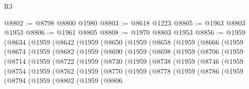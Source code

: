 \begin{lexlean}{R3}
\begin{coremodule}
@8802 := @8798 @8800 @1980
@8803 := @8618 @1223
@8805 := @1963 @8803 @1953
@8806 := @1961 @8805
@8808 := @1970 @8803 @1953
@8856 := @1959
    (@8634
      (@1959
        (@8642
          (@1959
            (@8650
              (@1959
                (@8658
                  (@1959
                    (@8666
                      (@1959
                        (@8674
                          (@1959
                            (@8682
                              (@1959
                                (@8690
                                  (@1959
                                    (@8698
                                      (@1959
                                        (@8706
                                          (@1959
                                            (@8714
                                              (@1959
                                                (@8722
                                                  (@1959
                                                    (@8730
                                                      (@1959
                                                        (@8738
                                                          (@1959
                                                            (@8746
                                                              (@1959
                                                                (@8754
                                                                  (@1959
                                                                    (@8762
                                                                      (@1959
                                                                        (@8770
                                                                          (@1959
                                                                            (@8778
                                                                              (@1959
                                                                                (@8786
                                                                                  (@1959
                                                                                    (@8794
                                                                                      (@1959
                                                                                        (@8802
                                                                                          (@1959
                                                                                            (@8806

\end{coremodule}
\end{lexlean}
